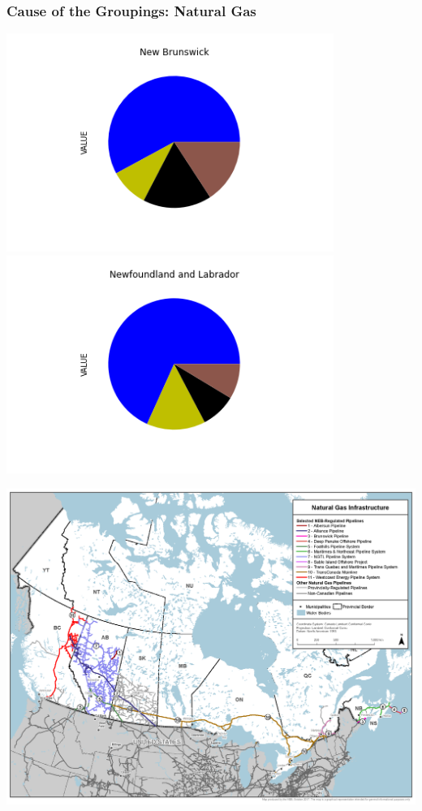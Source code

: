 \documentclass{beamer}
\begin{document}
\begin{frame}

\frametitle{Cause of the Groupings: Natural Gas}

\begin{minipage}[b]{0.2\textwidth}
\includegraphics[width=0.8\textwidth, trim={120pt 50pt 110pt 40pt}, clip]{Ben_Images/NB.png}\\
\includegraphics[width=0.8\textwidth, trim={120pt 50pt 110pt 40pt}, clip]{Ben_Images/NL.png}%
\end{minipage}%
%
%
\begin{minipage}[b]{0.55\textwidth}
\begin{center}
\includegraphics[width=\textwidth, trim={10 80pt 240pt 220pt}, clip]{natural_gas_pipeline_natural_resources_canada}
\end{center}
\end{minipage}




\end{frame}
\end{document}
